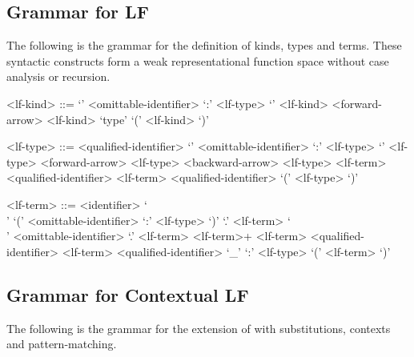 \subsection{Grammar for \acs{LF}}\label{section:syntax-lf}

The following is the grammar for the definition of \LF kinds, types and terms.
These syntactic constructs form a weak representational function space without case analysis or recursion.

\begin{grammar}
<lf-kind> ::= `{' <omittable-identifier> `:' <lf-type> `}' <lf-kind>
 <forward-arrow> <lf-kind>
\alt `type'
\alt `(' <lf-kind> `)'

<lf-type> ::= <qualified-identifier>
\alt `{' <omittable-identifier> `:' <lf-type> `}' <lf-type>
 <forward-arrow> <lf-type>
 <backward-arrow> <lf-type>
 <lf-term>
 <qualified-identifier> <lf-term>
 <qualified-identifier>
\alt `(' <lf-type> `)'

<lf-term> ::= <identifier>
\alt `\\' `(' <omittable-identifier> `:' <lf-type> `)' `.' <lf-term>
\alt `\\' <omittable-identifier> `.' <lf-term>
 <lf-term>+
 <lf-term>
 <qualified-identifier> <lf-term>
 <qualified-identifier>
\alt `_'
 `:' <lf-type>
\alt `(' <lf-term> `)'
\end{grammar}

\subsection{Grammar for Contextual \acs{LF}}\label{section:syntax-contextual-lf}

The following is the grammar for the extension of \LF with substitutions, contexts and pattern-matching.

